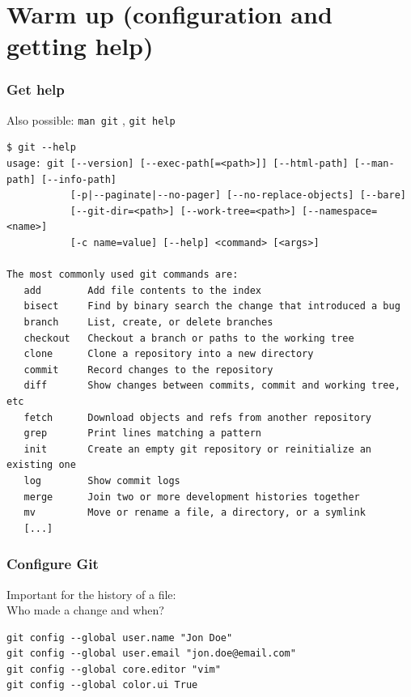 \documentclass{gittalk}
\newcommand{\hlcommand}[1]{ %
\colorbox{base3}{\small \texttt{#1}}
}
\begin{document}
\section{Warm up (configuration and getting help)}

\begin{frame}[fragile]
\frametitle{Get help}

\begin{tcolorbox}[title=git -{}-help]
Also possible: \hlcommand{man git}, \hlcommand{git help}
\end{tcolorbox}

\begin{lstlisting}[basicstyle=\tiny\ttfamily\color{black}]
$ git --help
usage: git [--version] [--exec-path[=<path>]] [--html-path] [--man-path] [--info-path]
           [-p|--paginate|--no-pager] [--no-replace-objects] [--bare]
           [--git-dir=<path>] [--work-tree=<path>] [--namespace=<name>]
           [-c name=value] [--help] <command> [<args>]

The most commonly used git commands are:
   add        Add file contents to the index
   bisect     Find by binary search the change that introduced a bug
   branch     List, create, or delete branches
   checkout   Checkout a branch or paths to the working tree
   clone      Clone a repository into a new directory
   commit     Record changes to the repository
   diff       Show changes between commits, commit and working tree, etc
   fetch      Download objects and refs from another repository
   grep       Print lines matching a pattern
   init       Create an empty git repository or reinitialize an existing one
   log        Show commit logs
   merge      Join two or more development histories together
   mv         Move or rename a file, a directory, or a symlink
   [...]

\end{lstlisting}
\end{frame}

\begin{frame}[fragile]
\frametitle{Configure Git}
\begin{tcolorbox}[title=git config]
Important for the history of a file:\\
Who made a change and when?
\end{tcolorbox}
\vspace*{2em}
\begin{lstlisting}
git config --global user.name "Jon Doe"
git config --global user.email "jon.doe@email.com"
git config --global core.editor "vim"
git config --global color.ui True
\end{lstlisting}
\end{frame}
\end{document}
